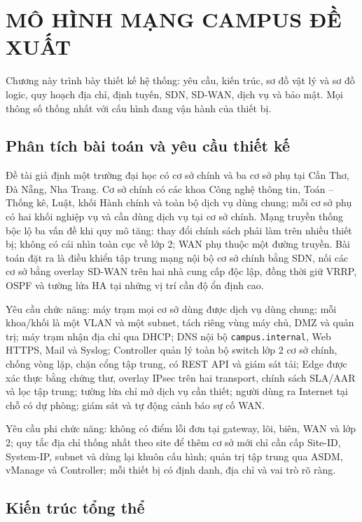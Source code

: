 \section{MÔ HÌNH MẠNG CAMPUS ĐỀ XUẤT}\label{sec:mo_hinh_de_xuat}

Chương này trình bày thiết kế hệ thống: yêu cầu, kiến trúc, sơ đồ vật lý và sơ đồ logic, quy hoạch địa chỉ, định tuyến, SDN, SD-WAN, dịch vụ và bảo mật. Mọi thông số thống nhất với cấu hình đang vận hành của thiết bị.

\subsection{Phân tích bài toán và yêu cầu thiết kế}

Đề tài giả định một trường đại học có cơ sở chính và ba cơ sở phụ tại Cần Thơ, Đà Nẵng, Nha Trang. Cơ sở chính có các khoa Công nghệ thông tin, Toán -- Thống kê, Luật, khối Hành chính và toàn bộ dịch vụ dùng chung; mỗi cơ sở phụ có hai khối nghiệp vụ và cần dùng dịch vụ tại cơ sở chính. Mạng truyền thống bộc lộ ba vấn đề khi quy mô tăng: thay đổi chính sách phải làm trên nhiều thiết bị; không có cái nhìn toàn cục về lớp 2; WAN phụ thuộc một đường truyền. Bài toán đặt ra là điều khiển tập trung mạng nội bộ cơ sở chính bằng SDN, nối các cơ sở bằng overlay SD-WAN trên hai nhà cung cấp độc lập, đồng thời giữ VRRP, OSPF và tường lửa HA tại những vị trí cần độ ổn định cao.

Yêu cầu chức năng: máy trạm mọi cơ sở dùng được dịch vụ dùng chung; mỗi khoa/khối là một VLAN và một subnet, tách riêng vùng máy chủ, DMZ và quản trị; máy trạm nhận địa chỉ qua DHCP; DNS nội bộ \texttt{campus.internal}, Web HTTPS, Mail và Syslog; Controller quản lý toàn bộ switch lớp 2 cơ sở chính, chống vòng lặp, chặn cổng tập trung, có REST API và giám sát tải; Edge được xác thực bằng chứng thư, overlay IPsec trên hai transport, chính sách SLA/AAR và lọc tập trung; tường lửa chỉ mở dịch vụ cần thiết; người dùng ra Internet tại chỗ có dự phòng; giám sát và tự động cảnh báo sự cố WAN.

Yêu cầu phi chức năng: không có điểm lỗi đơn tại gateway, lõi, biên, WAN và lớp 2; quy tắc địa chỉ thống nhất theo site để thêm cơ sở mới chỉ cần cấp Site-ID, System-IP, subnet và dùng lại khuôn cấu hình; quản trị tập trung qua ASDM, vManage và Controller; mỗi thiết bị có định danh, địa chỉ và vai trò rõ ràng.

\subsection{Kiến trúc tổng thể}

